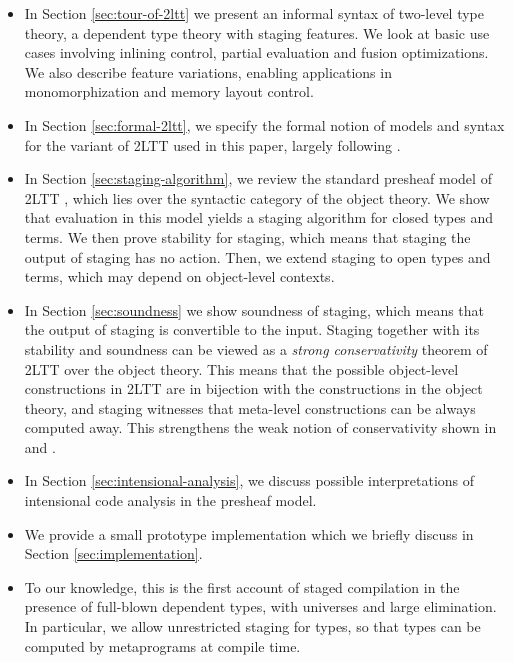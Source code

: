 \documentclass[acmsmall]{acmart}
\theoremstyle{remark}
\begin{document}
\begin{itemize}
  \item In Section \ref{sec:tour-of-2ltt} we present an informal syntax of two-level
    type theory, a dependent type theory with staging features. We look at basic
    use cases involving inlining control, partial evaluation and fusion
    optimizations. We also describe feature variations, enabling applications in
    monomorphization and memory layout control.
  \item In Section \ref{sec:formal-2ltt}, we specify the formal notion of models and
    syntax for the variant of 2LTT used in this paper, largely following \cite{twolevel}.
  \item In Section \ref{sec:staging-algorithm}, we review the standard presheaf
    model of 2LTT \cite[Section~2.5.3]{twolevel}, which lies over the syntactic
    category of the object theory.  We show that evaluation in this model yields
    a staging algorithm for closed types and terms. We then prove stability for
    staging, which means that staging the output of staging has no action. Then,
    we extend staging to open types and terms, which may depend on object-level
    contexts.
  \item
    In Section \ref{sec:soundness} we show soundness of staging, which means that
    the output of staging is convertible to the input.  Staging together with
    its stability and soundness can be viewed as a \emph{strong conservativity}
    theorem of 2LTT over the object theory. This means that the possible
    object-level constructions in 2LTT are in bijection with the constructions
    in the object theory, and staging witnesses that meta-level constructions
    can be always computed away. This strengthens the weak notion of
    conservativity shown in \cite{capriotti2017models} and \cite{twolevel}.
  \item
    In Section \ref{sec:intensional-analysis}, we discuss possible interpretations
    of intensional code analysis in the presheaf model.
  \item We provide a small prototype implementation which we briefly discuss in
    Section \ref{sec:implementation}.
  \item To our knowledge, this is the first account of staged compilation in the
    presence of full-blown dependent types, with universes and large
    elimination. In particular, we allow unrestricted staging for types, so that
    types can be computed by metaprograms at compile time.
\end{itemize}
\end{document}
